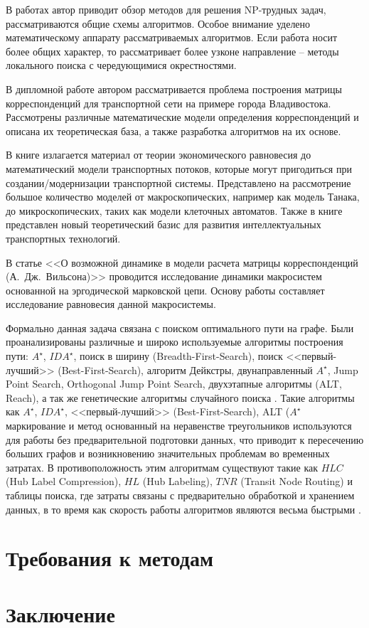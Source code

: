 В работах \cite{bib:54,bib:57} автор приводит обзор методов для решения NP-трудных задач, рассматриваются 
общие схемы алгоритмов. Особое внимание уделено математическому аппарату рассматриваемых алгоритмов. 
Если работа \cite{bib:54} носит более общих характер, то \cite{bib:57} рассматривает более узконе 
направление -- методы локального поиска с чередующимися окрестностями.

В дипломной работе \cite{bib:22} автором рассматривается проблема построения матрицы корреспонденций для 
транспортной сети на примере города Владивостока. Рассмотрены различные математические модели определения 
корреспонденций и описана их теоретическая база, а также разработка алгоритмов на их основе.

В книге \cite{bib:23} излагается материал от теории экономического равновесия до математический модели 
транспортных потоков, которые могут пригодиться при создании/модернизации транспортной системы. Представлено 
на рассмотрение большое количество моделей от макроскопических, например как модель Танака, до микроскопических, 
таких как модели клеточных автоматов. Также в книге представлен новый теоретический базис для развития 
интеллектуальных транспортных технологий.

В статье <<О возможной динамике в модели расчета матрицы корреспонденций (А.~Дж.~Вильсона)>>\cite{bib:24} 
проводится исследование динамики макросистем основанной на эргодической марковской цепи. Основу работы 
составляет исследование равновесия данной макросистемы.



Формально данная задача связана с поиском оптимального пути на графе. Были проанализированы различные и 
широко используемые алгоритмы построения пути: \( A^\star \), \( IDA^\star \), поиск в ширину 
(Breadth-First-Search), поиск <<первый-лучший>> (Best-First-Search), алгоритм Дейкстры, двунаправленный 
\( A^\star \), Jump Point Search, Orthogonal Jump Point Search, двухэтапные алгоритмы (ALT, Reach), а 
так же генетические алгоритмы случайного поиска \cite{bib:19}.  Такие алгоритмы как \( A^\star \), 
\( IDA^\star \), <<первый-лучший>> (Best-First-Search), ALT (\( A^\star \) маркирование и метод основанный на 
неравенстве треугольников используются для работы без предварительной подготовки данных, что приводит к 
пересечению больших графов и возникновению значительных проблемам во временных затратах. В противоположность 
этим алгоритмам существуют такие как \( HLC \) (Hub Label Compression), \( HL \) (Hub Labeling), 
\( TNR \) (Transit Node Routing) и таблицы поиска, где затраты связаны с предварительно обработкой и 
хранением данных, в то время как скорость работы алгоритмов являются весьма быстрыми \cite{bib:21}.
\section{Требования к методам}
\section{Заключение}